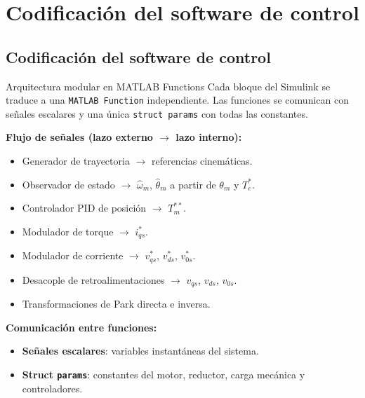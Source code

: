 \documentclass[aspectratio=169,t]{beamer}
\newcommand{\SecPresentacion}{Presentación del problema}
\newcommand{\SecMecanico}{Subsistema mecánico equivalente}
\newcommand{\SecElectromagnetico}{Subsistema electromagnético en coordenadas qd0}
\newcommand{\SecTermico}{Subsistema térmico}
\newcommand{\SecNLGlobal}{Sistema No Lineal Global}
\newcommand{\SecLPV}{Linealización Jacobiana (LPV)}
\newcommand{\SecLTI}{Obtención del modelo LTI equivalente}
\newcommand{\SecAnalisisLTI}{Análisis del modelo LTI aumentado}
\newcommand{\SecDinamica}{Respuesta dinámica en dominio del tiempo}
\newcommand{\SecControlador}{Diseño y análisis del controlador en cascada}
\newcommand{\SecVerifSpecs}{Verificación de desempeño: Especificaciones de operación}
\newcommand{\SecVerifOffset}{Verificación de desempeño: Offset de estado estacionario}
\newcommand{\SecVerifNoIdealidades}{Verificación de desempeño: No idealidades y comportamiento térmico}
\newcommand{\SecDiscretizacion}{Discretización del controlador}
\newcommand{\SecSoftware}{Codificación del software de control}
\newcommand{\AgendaItem}[3]{%
  \ifnum#1=#2
    {\scriptsize\bfseries\color{uncBlue}%
      \hyperlink{sec:#1}{\makebox[2.2em][r]{#1.}\hspace{0.7em}%
      \parbox[t]{0.86\textwidth}{#3}}\par}%
  \else
    {\scriptsize\color{black!26}%
      \hyperlink{sec:#1}{\makebox[2.2em][r]{#1.}\hspace{0.7em}%
      \parbox[t]{0.86\textwidth}{#3}}\par}%
  \fi
  \vspace{0.35mm}%
}
\newcommand{\AgendaBody}[1]{%
    \vspace{3mm}
    {\Large\bfseries\color{uncBlue}Tabla de contenidos\par}
    \vspace{2mm}
    \begin{minipage}{0.94\textwidth}
      \AgendaItem{1}{#1}{\SecPresentacion}
      \AgendaItem{2}{#1}{\SecMecanico}
      \AgendaItem{3}{#1}{\SecElectromagnetico}
      \AgendaItem{4}{#1}{\SecTermico}
      \AgendaItem{5}{#1}\SecNLGlobal
      \AgendaItem{6}{#1}{\SecLPV}
      \AgendaItem{7}{#1}{\SecLTI}
      \AgendaItem{8}{#1}{\SecAnalisisLTI}
      \AgendaItem{9}{#1}{\SecDinamica}
      \AgendaItem{10}{#1}{\SecControlador}
      \AgendaItem{11}{#1}{\SecVerifSpecs}
      \AgendaItem{12}{#1}{\SecVerifOffset}
      \AgendaItem{13}{#1}{\SecVerifNoIdealidades}
      \AgendaItem{14}{#1}{\SecDiscretizacion}
      \AgendaItem{15}{#1}{\SecSoftware}
    \end{minipage}
    \vfill
}
\newcommand{\AgendaSlideTarget}[2]{%
  \begin{frame}[plain]
    \hypertarget{#2}{}%
    \AgendaBody{#1}
  \end{frame}
}
\newcommand{\StartProjectSection}[2]{%
  \section{#2}%
  \subsection{#2}%
  \AgendaSlideTarget{#1}{sec:#1}%
}
\begin{document}

\StartProjectSection{15}{\SecSoftware}

\begin{frame}{Arquitectura modular en MATLAB Functions}
{\small\color{uncGray}Cada bloque del Simulink se traduce a una \texttt{MATLAB Function} independiente. Las funciones se comunican con señales escalares y una única \texttt{struct params} con todas las constantes.}\par
\vspace{3mm}

\textbf{Flujo de señales (lazo externo $\to$ lazo interno):}
\begin{itemize}\small
\item Generador de trayectoria $\to$ referencias cinemáticas.
\item Observador de estado $\to$ $\hat{\omega}_m$, $\hat{\theta}_m$ a partir de $\theta_m$ y $T_e^{*}$.
\item Controlador PID de posición $\to$ $T_m^{**}$.
\item Modulador de torque $\to$ $i_{qs}^{*}$.
\item Modulador de corriente $\to$ $v_{qs}^{*}$, $v_{ds}^{*}$, $v_{0s}^{*}$.
\item Desacople de retroalimentaciones $\to$ $v_{qs}$, $v_{ds}$, $v_{0s}$.
\item Transformaciones de Park directa e inversa.
\end{itemize}

\vspace{2mm}
\textbf{Comunicación entre funciones:}
\begin{itemize}\small
\item \textbf{Señales escalares}: variables instantáneas del sistema.
\item \textbf{Struct \texttt{params}}: constantes del motor, reductor, carga mecánica y controladores.
\end{itemize}
\end{frame}
\end{document}
